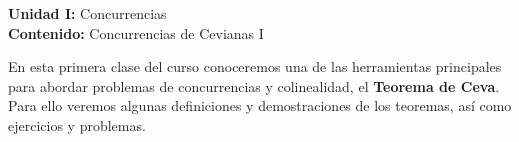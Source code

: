 {\Large
    \textbf{Unidad I:} Concurrencias\vspace{2mm}\\
    \textbf{Contenido:} Concurrencias de Cevianas I
}

En esta primera clase del curso conoceremos una de las herramientas principales para abordar problemas de concurrencias y colinealidad, el \textbf{Teorema de Ceva}.
Para ello veremos algunas definiciones y demostraciones de los teoremas, así como ejercicios y problemas.

